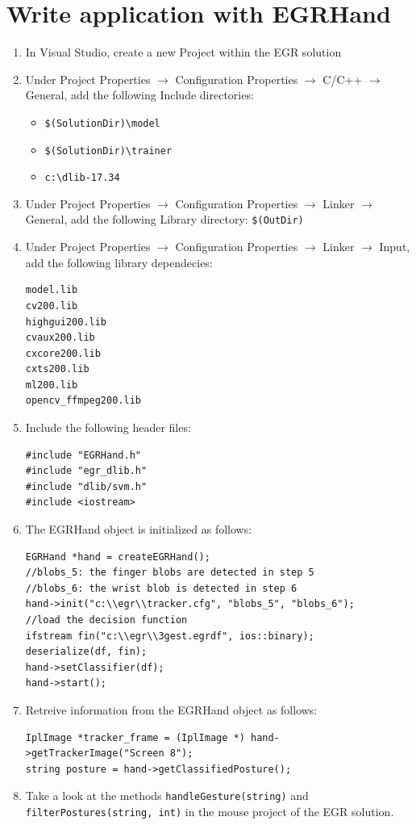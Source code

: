\section*{Write application with EGRHand}
\begin{enumerate}
\item In Visual Studio, create a new Project within the EGR solution
\item Under Project Properties $\rightarrow$ Configuration Properties $\rightarrow$ C/C++ $\rightarrow$ General, add the following Include directories:
\begin{itemize}
\item \verb+$(SolutionDir)\model+
\item \verb+$(SolutionDir)\trainer+
\item \verb+c:\dlib-17.34+
\end{itemize}
\item Under Project Properties $\rightarrow$ Configuration Properties $\rightarrow$ Linker $\rightarrow$ General, add the following Library directory: 
\verb+$(OutDir)+
\item Under Project Properties $\rightarrow$ Configuration Properties $\rightarrow$ Linker $\rightarrow$ Input, add the following library dependecies: 
\begin{lstlisting}
model.lib
cv200.lib
highgui200.lib
cvaux200.lib
cxcore200.lib
cxts200.lib
ml200.lib
opencv_ffmpeg200.lib
\end{lstlisting}
\item Include the following header files:
\begin{lstlisting}
#include "EGRHand.h"
#include "egr_dlib.h"
#include "dlib/svm.h"
#include <iostream>
\end{lstlisting}
\item The EGRHand object is initialized as follows:
\begin{lstlisting}
EGRHand *hand = createEGRHand();
//blobs_5: the finger blobs are detected in step 5
//blobs_6: the wrist blob is detected in step 6
hand->init("c:\\egr\\tracker.cfg", "blobs_5", "blobs_6");
//load the decision function 
ifstream fin("c:\\egr\\3gest.egrdf", ios::binary);
deserialize(df, fin);
hand->setClassifier(df);
hand->start();
\end{lstlisting}
\clearpage
\item Retreive information from the EGRHand object as follows:
\begin{lstlisting}
IplImage *tracker_frame = (IplImage *) hand->getTrackerImage("Screen 8");
string posture = hand->getClassifiedPosture();
\end{lstlisting}
\item Take a look at the methods \texttt{handleGesture(string)} and \texttt{filterPostures(string, int)} in the mouse project of the EGR solution.
\end{enumerate}